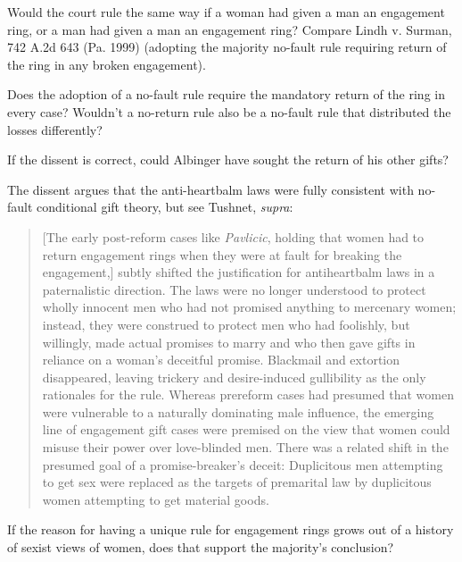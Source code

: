 \item Would the court rule the same way if a woman had given a man an engagement
ring, or a man had given a man an engagement ring? Compare Lindh v. Surman, 742
A.2d 643 (Pa. 1999) (adopting the majority no-fault rule requiring return of
the ring in any broken engagement).  


\item Does the adoption of a no-fault rule require the mandatory return of the
ring in every case? Wouldn't a no-return rule also be a no-fault rule that
distributed the losses differently?  


\item If the dissent is correct, could Albinger have sought the return of his
other gifts? 


\item The dissent argues that the anti-heartbalm laws were fully consistent with
no-fault conditional gift theory, but see Tushnet, \textit{supra}:
\begin{quote}
[The early post-reform cases like \textit{Pavlicic}, holding that women had to
return engagement rings when they were at fault for breaking the engagement,]
subtly shifted the justification for antiheartbalm laws in a paternalistic
direction. The laws were no longer understood to protect wholly innocent men
who had not promised anything to mercenary women; instead, they were construed
to protect men who had foolishly, but willingly, made actual promises to marry
and who then gave gifts in reliance on a woman's deceitful promise. Blackmail
and extortion disappeared, leaving trickery and desire-induced gullibility as
the only rationales for the rule. Whereas prereform cases had presumed that
women were vulnerable to a naturally dominating male influence, the emerging
line of engagement gift cases were premised on the view that women could misuse
their power over love-blinded men. There was a related shift in the presumed
goal of a promise-breaker's deceit: Duplicitous men attempting to get sex were
replaced as the targets of premarital law by duplicitous women attempting to
get material goods.
\end{quote}
If the reason for having a unique rule for engagement rings grows out of a
history of sexist views of women, does that support the majority's conclusion?




